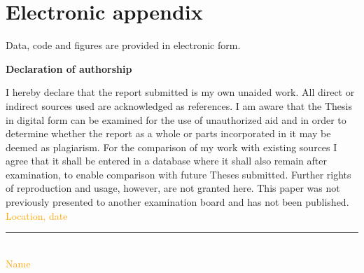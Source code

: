 \documentclass[12pt]{article}
\begin{document}









\setcounter{page}{5} %

\appendix


\newpage

\section{Electronic appendix}
\label{el_app}

Data, code and figures are provided in electronic form.

\newpage


\RaggedRight


\newpage


\Large
\noindent
\textbf{Declaration of authorship}
\vspace{0.5cm}
\noindent
\normalsize

I hereby declare that the report submitted is my own unaided work. All direct
or indirect sources used are acknowledged as references. I am aware that the
Thesis in digital form can be examined for the use of unauthorized aid and in
order to determine whether the report as a whole or parts incorporated in it
may be deemed as plagiarism. For the comparison of my work with existing
sources I agree that it shall be entered in a database where it shall also
remain after examination, to enable comparison with future Theses submitted.
Further rights of reproduction and usage, however, are not granted here. This
paper was not previously presented to another examination board and has not
been published. \\

\vspace{1cm}
\textcolor{orange}{Location, date} \\

\vspace{3cm}

\noindent\rule{0.5\textwidth}{0.4pt} \\

\textcolor{orange}{Name}

\end{document}
